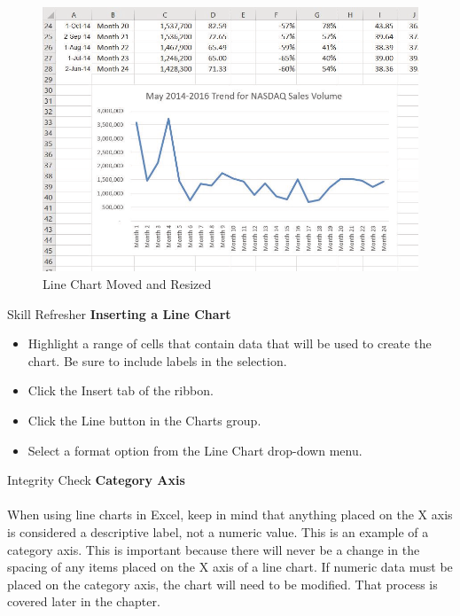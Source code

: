 \begin{figure}[H]
	\centering
	\includegraphics[width=\maxwidth{.95\linewidth}]{gfx/ch04_fig04}
	\caption{Line Chart Moved and Resized}
	\label{04:fig04}
\end{figure}

\begin{center}
	\begin{sklbox}{Skill Refresher}
		\textbf{Inserting a Line Chart}
		\\
		\begin{itemize}
			\setlength{\itemsep}{0pt}
			\setlength{\parskip}{0pt}
			\setlength{\parsep}{0pt}

			\item Highlight a range of cells that contain data that will be used to create the chart. Be sure to include labels in the selection.
			\item Click the Insert tab of the ribbon.
			\item Click the Line button in the Charts group.
			\item Select a format option from the Line Chart drop-down menu.
			
		\end{itemize}
	\end{sklbox}
\end{center}

\begin{center}
	\begin{infobox}{Integrity Check}
		\textbf{Category Axis}
		\\
		\\
		When using line charts in Excel, keep in mind that anything placed on the X axis is considered a descriptive label, not a numeric value. This is an example of a category axis. This is important because there will never be a change in the spacing of any items placed on the X axis of a line chart. If numeric data must be placed on the category axis, the chart will need to be modified. That process is covered later in the chapter.		
	\end{infobox}
\end{center}

